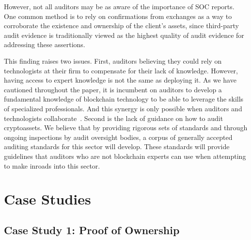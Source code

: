 However, not all auditors may be as aware of the importance of SOC reports. One common method is to rely on confirmations from exchanges as a way to corroborate the existence and ownership of the client's assets, since third-party audit evidence is traditionally viewed as the highest quality of audit evidence for addressing these assertions. 

This finding raises two issues. First, auditors believing they could rely on technologists at their firm to compensate for their lack of knowledge. However, having access to expert knowledge is not the same as deploying it. As we have cautioned throughout the paper, it is incumbent on auditors to develop a fundamental knowledge of blockchain technology to be able to leverage the skills of specialized professionals. And this synergy is only possible when auditors and technologists collaborate~\cite{bauer2019one}. Second is the lack of guidance on how to audit cryptoassets. We believe that by providing rigorous sets of standards and through ongoing inspections by audit oversight bodies, a corpus of generally accepted auditing standards for this sector will develop. These standards will provide guidelines that auditors who are not blockchain experts can use when attempting to make inroads into this sector. 


\section{Case Studies} \label{sec:auditing:case-studies}







\subsection{Case Study 1: Proof of Ownership} \label{sec:auditing:case-studies:ownership}

